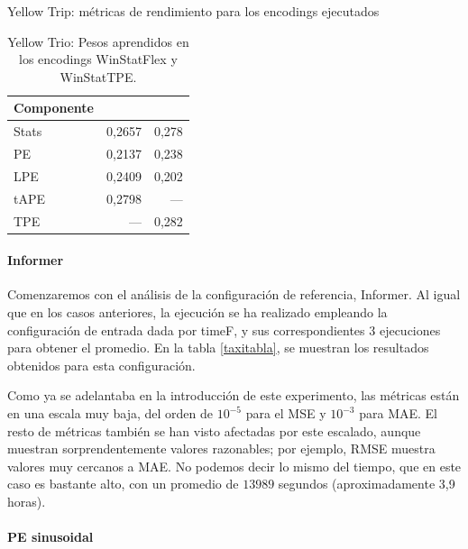 \begin{landscape}
\begin{table}[H]
		\caption{Yellow Trip: métricas de rendimiento para los encodings ejecutados}
		\label{taxitabla}
		\end{table}
	
		\vspace{1cm} %
	
		\begin{table}[H]
				\centering
				\begin{tabular}{lNN}
					\toprule
					Componente &  &  \\
					\midrule
					Stats & 0,2657 & 0,278 \\
					PE    & 0,2137 & 0,238 \\
					LPE   & 0,2409 & 0,202 \\
					tAPE  & 0,2798 & —     \\
					TPE   & —      & 0,282 \\
					\bottomrule
				\end{tabular}
				\caption{Yellow Trio: Pesos aprendidos en los encodings WinStatFlex y WinStatTPE.}
				\label{taxi_pesos}
		\end{table}

	
	
\end{landscape}


\paragraph{Informer}

Comenzaremos con el análisis de la configuración de referencia, Informer. Al igual que en los casos anteriores, la ejecución se ha realizado empleando la configuración de entrada dada por timeF, y sus correspondientes 3 ejecuciones para obtener el promedio. En la tabla \ref{taxitabla}, se muestran los resultados obtenidos para esta configuración. 

Como ya se adelantaba en la introducción de este experimento, las métricas están en una escala muy baja, del orden de $10^{-5}$ para el MSE y $10^{-3}$ para MAE. El resto de métricas también se han visto afectadas por este escalado, aunque muestran sorprendentemente valores razonables; por ejemplo, RMSE muestra valores muy cercanos a MAE. No podemos decir lo mismo del tiempo, que en este caso es bastante alto, con un promedio de $13989$ segundos (aproximadamente 3,9 horas).

\paragraph{PE sinusoidal}

